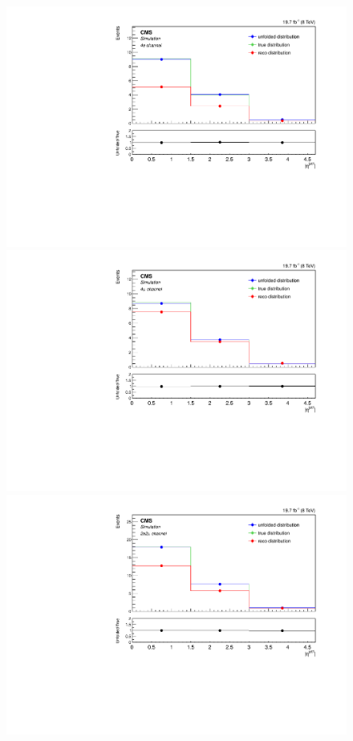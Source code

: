 \begin{figure}[hbtp]
\begin{center}
    \includegraphics[width=0.8\cmsFigWidth]{Figures/Unfolding/MCTests/EtaJet1_ZZTo4e_PowMatrix_PowDistr_HalfSample_fr}     
    \includegraphics[width=0.8\cmsFigWidth]{Figures/Unfolding/MCTests/EtaJet1_ZZTo4m_PowMatrix_PowDistr_HalfSample_fr}     
 \includegraphics[width=0.8\cmsFigWidth]{Figures/Unfolding/MCTests/EtaJet1_ZZTo2e2m_PowMatrix_PowDistr_HalfSample_fr}        

\end{center}
\end{figure}
